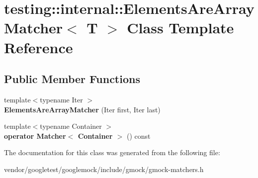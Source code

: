 \hypertarget{classtesting_1_1internal_1_1_elements_are_array_matcher}{}\section{testing\+:\+:internal\+:\+:Elements\+Are\+Array\+Matcher$<$ T $>$ Class Template Reference}
\label{classtesting_1_1internal_1_1_elements_are_array_matcher}
\subsection*{Public Member Functions}
\begin{DoxyCompactItemize}
\item 
\mbox{\label{classtesting_1_1internal_1_1_elements_are_array_matcher_aa076a0583c29dc7da6107775bba73be8}} 
{\footnotesize template$<$typename Iter $>$ }\\{\bfseries Elements\+Are\+Array\+Matcher} (Iter first, Iter last)
\item 
\mbox{\label{classtesting_1_1internal_1_1_elements_are_array_matcher_ac776db6072208f39f3eced25fb353f75}} 
{\footnotesize template$<$typename Container $>$ }\\{\bfseries operator Matcher$<$ Container $>$} () const
\end{DoxyCompactItemize}


The documentation for this class was generated from the following file\+:\begin{DoxyCompactItemize}
\item 
vendor/googletest/googlemock/include/gmock/gmock-\/matchers.\+h\end{DoxyCompactItemize}
